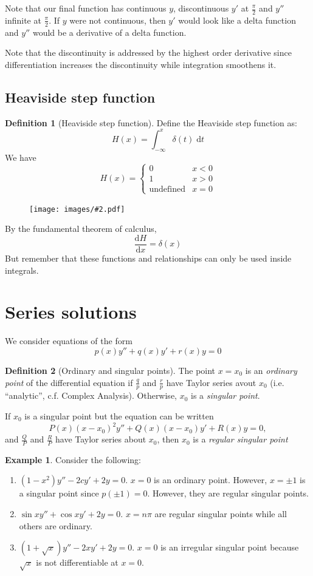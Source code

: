 \documentclass[a4paper]{article}
\theoremstyle{definition}
\newtheorem*{defi}{Definition}
\newtheorem*{eg}{Example}
\renewcommand{\d}{\mathrm{d}}
\let\stdsection\section
\renewcommand\section{\newpage\stdsection}
\newcommand{\img}[2][]{\begin{figure}[ht]\centering\texttt{[image: images/\#2.pdf]}\end{figure}}
\begin{document}
Note that our final function has continuous $y$, discontinuous $y'$ at $\frac{\pi}{2}$ and $y''$ infinite at $\frac{\pi}{2}$. If $y$ were not continuous, then $y'$ would look like a delta function and $y''$ would be a derivative of a delta function.

Note that the discontinuity is addressed by the highest order derivative since differentiation increases the discontinuity while integration smoothens it.

\subsection{Heaviside step function}

\begin{defi}[Heaviside step function]
  Define the Heaviside step function as:
  \[
  H(x) = \int_{-\infty}^x \delta(t) \;\d t
  \]
  We have
  \[
  H(x) =\begin{cases} 0 & x < 0\\1 & x > 0\\\text{undefined} & x = 0\end{cases}
  \]

\img[width=250pt]{de_21}

By the fundamental theorem of calculus, 
\[
\frac{\d H}{\d x} = \delta(x)
\]
But remember that these functions and relationships can only be used inside integrals.
\end{defi}

\section{Series solutions}
We consider equations of the form 
\[
p(x) y'' + q(x) y' + r(x) y = 0
\]

\begin{defi}[Ordinary and singular points]
  The point $x = x_0$ is an \emph{ordinary point} of the differential equation if $\frac{q}{p}$ and $\frac{r}{p}$ have Taylor series avout $x_0$ (i.e. ``analytic'', c.f. Complex Analysis). Otherwise, $x_0$ is a \emph{singular point}.

If $x_0$ is a singular point but the equation can be written
\[
P(x)(x - x_0)^2y'' + Q(x)(x - x_0)y' + R(x)y = 0,
\]
and $\frac{Q}{P}$ and $\frac{R}{P}$ have Taylor series about $x_0$, then $x_0$ is a \emph{regular singular point}
\end{defi}

\begin{eg}
  Consider the following:
  \begin{enumerate}
  \item $(1 - x^2)y'' - 2cy' + 2y = 0$. $x = 0$ is an ordinary point. However, $x = \pm 1$ is a singular point since $p(\pm 1) = 0$. However, they are regular singular points.
  \item $\sin x y'' + \cos x y' + 2y = 0$. $x = n\pi$ are regular singular points while all others are ordinary.
  \item $(1 + \sqrt{x}) y'' - 2xy' + 2y = 0$. $x = 0$ is an irregular singular point because $\sqrt{x}$ is not differentiable at $x = 0$.
  \end{enumerate}
\end{eg}
\end{document}
